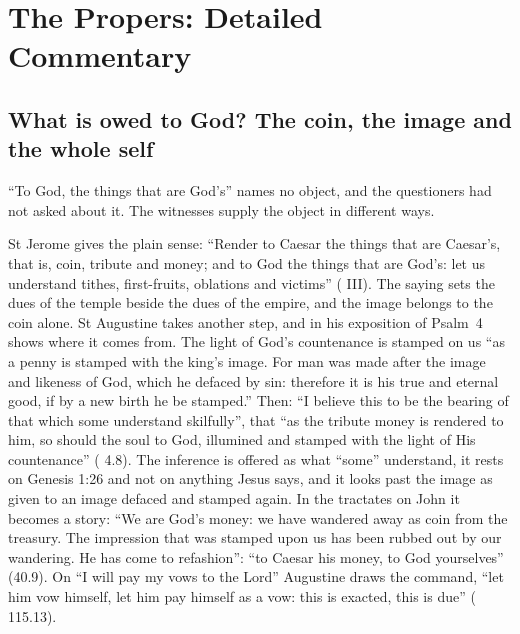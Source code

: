 
\section{The Propers: Detailed Commentary}

\subsection{What is owed to God? The coin, the image and the whole self}

``To God, the things that are God's'' names no object, and the questioners had
not asked about it. The witnesses supply the object in different ways.

St Jerome gives the plain sense: ``Render to Caesar the things that are
Caesar's, that is, coin, tribute and money; and to God the things that are
God's: let us understand tithes, first-fruits, oblations and victims''
( III). The saying sets the dues of the temple
beside the dues of the empire, and the image belongs to the coin alone. St
Augustine takes another step, and in his exposition of Psalm~4 shows where it
comes from. The light of God's countenance is stamped on us ``as a penny is
stamped with the king's image. For man was made after the image and likeness of
God, which he defaced by sin: therefore it is his true and eternal good, if by
a new birth he be stamped.'' Then: ``I believe this to be the bearing of that
which some understand skilfully'', that ``as the tribute money is rendered to
him, so should the soul to God, illumined and stamped with the light of His
countenance'' ( 4.8). The inference is offered
as what ``some'' understand, it rests on Genesis 1:26 and not on anything Jesus
says, and it looks past the image as given to an image defaced and stamped
again. In the tractates on John it becomes a story: ``We are God's money: we
have wandered away as coin from the treasury. The impression that was stamped
upon us has been rubbed out by our wandering. He has come to refashion'': ``to
Caesar his money, to God yourselves'' (40.9). On ``I will pay my vows to the
Lord'' Augustine draws the command, ``let him vow himself, let him pay himself
as a vow: this is exacted, this is due'' (
115.13).

